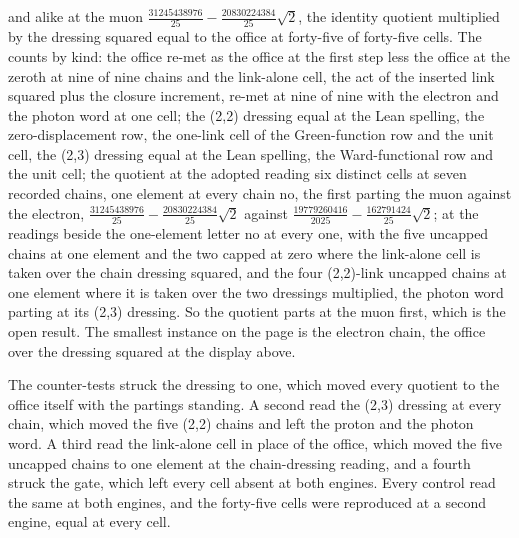 \begin{chproof}
and alike at the muon $\tfrac{31245438976}{25} - \tfrac{20830224384}{25}\sqrt{2}$, the identity quotient multiplied by the dressing squared equal to the office at forty-five of forty-five cells. The counts by kind: the office re-met as the office at the first step less the office at the zeroth at nine of nine chains and the link-alone cell, the act of the inserted link squared plus the closure increment, re-met at nine of nine with the electron and the photon word at one cell; the (2,2) dressing equal at the Lean spelling, the zero-displacement row, the one-link cell of the Green-function row and the unit cell, the (2,3) dressing equal at the Lean spelling, the Ward-functional row and the unit cell; the quotient at the adopted reading six distinct cells at seven recorded chains, one element at every chain no, the first parting the muon against the electron, $\tfrac{31245438976}{25} - \tfrac{20830224384}{25}\sqrt{2}$ against $\tfrac{19779260416}{2025} - \tfrac{162791424}{25}\sqrt{2}$; at the readings beside the one-element letter no at every one, with the five uncapped chains at one element and the two capped at zero where the link-alone cell is taken over the chain dressing squared, and the four (2,2)-link uncapped chains at one element where it is taken over the two dressings multiplied, the photon word parting at its (2,3) dressing. So the quotient parts at the muon first, which is the open result. The smallest instance on the page is the electron chain, the office over the dressing squared at the display above.

The counter-tests struck the dressing to one, which moved every quotient to the office itself with the partings standing. A second read the (2,3) dressing at every chain, which moved the five (2,2) chains and left the proton and the photon word. A third read the link-alone cell in place of the office, which moved the five uncapped chains to one element at the chain-dressing reading, and a fourth struck the gate, which left every cell absent at both engines. Every control read the same at both engines, and the forty-five cells were reproduced at a second engine, equal at every cell.
\end{chproof}
